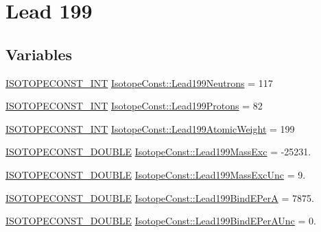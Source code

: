 \hypertarget{group___isotope_const-_lead-_pb199}{}\section{Lead 199}
\label{group___isotope_const-_lead-_pb199}
\subsection*{Variables}
\begin{DoxyCompactItemize}
\item 
\mbox{\hyperlink{group___isotope_const-_macros_ga5f18360b3e99483a35c32d789e62621c}{I\+S\+O\+T\+O\+P\+E\+C\+O\+N\+S\+T\+\_\+\+I\+NT}} \mbox{\hyperlink{group___isotope_const-_lead-_pb199_ga594f7d640d1b24c4b0183cbc2270c314}{Isotope\+Const\+::\+Lead199\+Neutrons}} = 117
\item 
\mbox{\hyperlink{group___isotope_const-_macros_ga5f18360b3e99483a35c32d789e62621c}{I\+S\+O\+T\+O\+P\+E\+C\+O\+N\+S\+T\+\_\+\+I\+NT}} \mbox{\hyperlink{group___isotope_const-_lead-_pb199_ga5a20a744cb023a45aa2b161dfca3f4d5}{Isotope\+Const\+::\+Lead199\+Protons}} = 82
\item 
\mbox{\hyperlink{group___isotope_const-_macros_ga5f18360b3e99483a35c32d789e62621c}{I\+S\+O\+T\+O\+P\+E\+C\+O\+N\+S\+T\+\_\+\+I\+NT}} \mbox{\hyperlink{group___isotope_const-_lead-_pb199_ga126a5a61ed141eac04c209154b86bfd4}{Isotope\+Const\+::\+Lead199\+Atomic\+Weight}} = 199
\item 
\mbox{\hyperlink{group___isotope_const-_macros_ga8f45a7272ce02c0b4c65c44636ed719a}{I\+S\+O\+T\+O\+P\+E\+C\+O\+N\+S\+T\+\_\+\+D\+O\+U\+B\+LE}} \mbox{\hyperlink{group___isotope_const-_lead-_pb199_gaa448ac526347b48c87d61bbc1ca9f7ed}{Isotope\+Const\+::\+Lead199\+Mass\+Exc}} = -\/25231.
\item 
\mbox{\hyperlink{group___isotope_const-_macros_ga8f45a7272ce02c0b4c65c44636ed719a}{I\+S\+O\+T\+O\+P\+E\+C\+O\+N\+S\+T\+\_\+\+D\+O\+U\+B\+LE}} \mbox{\hyperlink{group___isotope_const-_lead-_pb199_ga0d311a5ebc2b9100cb879ae02452d0b1}{Isotope\+Const\+::\+Lead199\+Mass\+Exc\+Unc}} = 9.
\item 
\mbox{\hyperlink{group___isotope_const-_macros_ga8f45a7272ce02c0b4c65c44636ed719a}{I\+S\+O\+T\+O\+P\+E\+C\+O\+N\+S\+T\+\_\+\+D\+O\+U\+B\+LE}} \mbox{\hyperlink{group___isotope_const-_lead-_pb199_gaa240d0696d7ac8316b3f4bb4ccdb9cfb}{Isotope\+Const\+::\+Lead199\+Bind\+E\+PerA}} = 7875.
\item 
\mbox{\hyperlink{group___isotope_const-_macros_ga8f45a7272ce02c0b4c65c44636ed719a}{I\+S\+O\+T\+O\+P\+E\+C\+O\+N\+S\+T\+\_\+\+D\+O\+U\+B\+LE}} \mbox{\hyperlink{group___isotope_const-_lead-_pb199_gaa9bcebcf2db0de925f140d9b5236a11d}{Isotope\+Const\+::\+Lead199\+Bind\+E\+Per\+A\+Unc}} = 0.

\end{DoxyCompactItemize}
